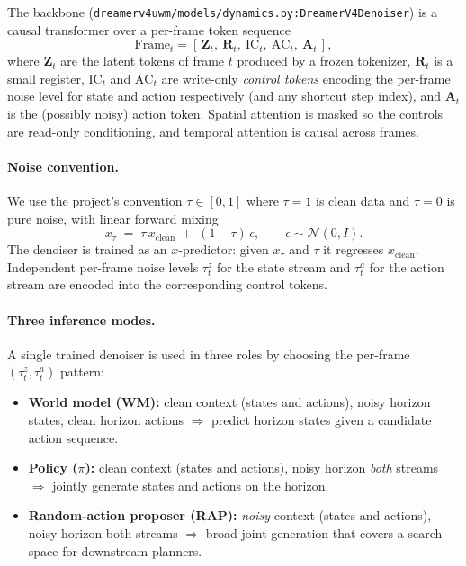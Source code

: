 \documentclass[11pt]{article}
\newcommand{\xclean}{x_{\mathrm{clean}}}
\begin{document}
The backbone (\texttt{dreamerv4uwm/models/dynamics.py:DreamerV4Denoiser}) is a causal transformer over a per-frame token sequence
\begin{equation}
    \mathrm{Frame}_t = [\, \mathbf{Z}_t,\ \mathbf{R}_t,\ \mathrm{IC}_t,\ \mathrm{AC}_t,\ \mathbf{A}_t \,],
\end{equation}
where $\mathbf{Z}_t$ are the latent tokens of frame $t$ produced by a frozen tokenizer, $\mathbf{R}_t$ is a small register, $\mathrm{IC}_t$ and $\mathrm{AC}_t$ are write-only \emph{control tokens} encoding the per-frame noise level for state and action respectively (and any shortcut step index), and $\mathbf{A}_t$ is the (possibly noisy) action token. Spatial attention is masked so the controls are read-only conditioning, and temporal attention is causal across frames.

\paragraph{Noise convention.}
We use the project's convention $\tau \in [0, 1]$ where $\tau = 1$ is clean data and $\tau = 0$ is pure noise, with linear forward mixing
\begin{equation}
    x_\tau \;=\; \tau\, \xclean \;+\; (1 - \tau)\,\epsilon, \qquad \epsilon \sim \mathcal{N}(0, I).
\end{equation}
The denoiser is trained as an $x$-predictor: given $x_\tau$ and $\tau$ it regresses $\xclean$. Independent per-frame noise levels $\tau_t^z$ for the state stream and $\tau_t^a$ for the action stream are encoded into the corresponding control tokens.

\paragraph{Three inference modes.}
A single trained denoiser is used in three roles by choosing the per-frame $(\tau^z_t, \tau^a_t)$ pattern:
\begin{itemize}
    \item \textbf{World model (WM):} clean context (states and actions), noisy horizon states, clean horizon actions $\Rightarrow$ predict horizon states given a candidate action sequence.
    \item \textbf{Policy ($\pi$):} clean context (states and actions), noisy horizon \emph{both} streams $\Rightarrow$ jointly generate states and actions on the horizon.
    \item \textbf{Random-action proposer (RAP):} \emph{noisy} context (states and actions), noisy horizon both streams $\Rightarrow$ broad joint generation that covers a search space for downstream planners.
\end{itemize}
\end{document}
